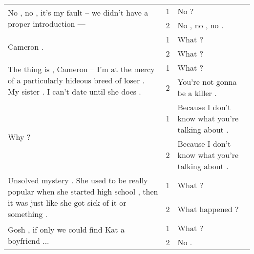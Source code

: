 \begin{table}
\begin{tabular}{p{}|cp{}}
        \hline
        \multirow{2}{.6\textwidth}{No , no , it's my fault -- we didn't have a proper introduction ---} & 1 & No ?\\
        & 2 & No , no , no .\\

        \hline
        \multirow{2}{.6\textwidth}{Cameron .} & 1 &  What ?\\
        & 2 & What ?\\

        \hline
        \multirow{2}{.6\textwidth}{The thing is , Cameron -- I'm at the mercy of a particularly hideous breed of loser . My sister . I can't date until she does .} & 1 & What ?\\
        & 2 & You're not gonna be a killer .\\

        \hline
        \multirow{2}{.6\textwidth}{Why ?} & 1 & Because I don't know what you're talking about .\\
        & 2 & Because I don't know what you're talking about .\\

        \hline
        \multirow{2}{.6\textwidth}{Unsolved mystery . She used to be really popular when she started high school , then it was just like she got sick of it or something .} & 1 &  What ?\\
        & 2 & What happened ?\\

        \hline
        \multirow{2}{.6\textwidth}{Gosh , if only we could find Kat a boyfriend ...} & 1 &  What ?\\
        & 2 & No . \\

        \bottomrule

    \end{tabular}
\end{table}
